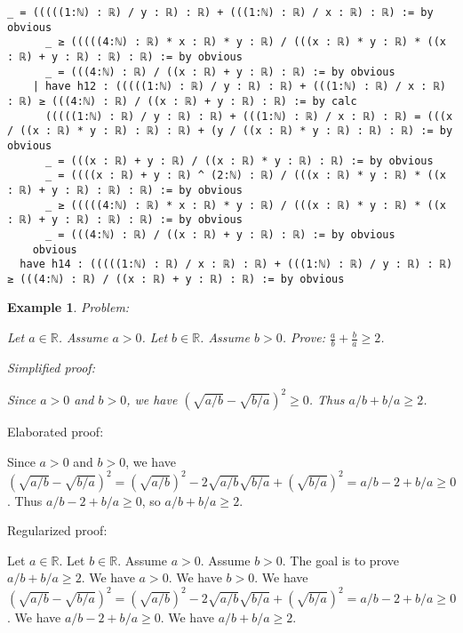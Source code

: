 \documentclass{article}
\newtheorem{example}{Example}
\begin{document}
\begin{tcolorbox}[colback=white!10, width=\linewidth]
\begin{lstlisting}[language=Lean4]
      _ = (((((1:ℕ) : ℝ) / y : ℝ) : ℝ) + (((1:ℕ) : ℝ) / x : ℝ) : ℝ) := by obvious
      _ ≥ (((((4:ℕ) : ℝ) * x : ℝ) * y : ℝ) / (((x : ℝ) * y : ℝ) * ((x : ℝ) + y : ℝ) : ℝ) : ℝ) := by obvious
      _ = (((4:ℕ) : ℝ) / ((x : ℝ) + y : ℝ) : ℝ) := by obvious
    | have h12 : (((((1:ℕ) : ℝ) / y : ℝ) : ℝ) + (((1:ℕ) : ℝ) / x : ℝ) : ℝ) ≥ (((4:ℕ) : ℝ) / ((x : ℝ) + y : ℝ) : ℝ) := by calc
      (((((1:ℕ) : ℝ) / y : ℝ) : ℝ) + (((1:ℕ) : ℝ) / x : ℝ) : ℝ) = (((x / ((x : ℝ) * y : ℝ) : ℝ) : ℝ) + (y / ((x : ℝ) * y : ℝ) : ℝ) : ℝ) := by obvious
      _ = (((x : ℝ) + y : ℝ) / ((x : ℝ) * y : ℝ) : ℝ) := by obvious
      _ = ((((x : ℝ) + y : ℝ) ^ (2:ℕ) : ℝ) / (((x : ℝ) * y : ℝ) * ((x : ℝ) + y : ℝ) : ℝ) : ℝ) := by obvious
      _ ≥ (((((4:ℕ) : ℝ) * x : ℝ) * y : ℝ) / (((x : ℝ) * y : ℝ) * ((x : ℝ) + y : ℝ) : ℝ) : ℝ) := by obvious
      _ = (((4:ℕ) : ℝ) / ((x : ℝ) + y : ℝ) : ℝ) := by obvious
    obvious
  have h14 : (((((1:ℕ) : ℝ) / x : ℝ) : ℝ) + (((1:ℕ) : ℝ) / y : ℝ) : ℝ) ≥ (((4:ℕ) : ℝ) / ((x : ℝ) + y : ℝ) : ℝ) := by obvious

\end{lstlisting}
\end{tcolorbox}


\begin{example}
Problem:
\begin{tcolorbox}[colback=yellow!10, width=\linewidth]
Let $a\in\mathbb{R}$. Assume $a > 0$.
    Let $b\in\mathbb{R}$. Assume $b > 0$.
    Prove: $\frac{a}{b} + \frac{b}{a} \ge 2$.
\end{tcolorbox}

Simplified proof:
\begin{tcolorbox}[colback=blue!10, width=\linewidth]
Since $a>0$ and $b>0$, we have $(\sqrt{a/b} - \sqrt{b/a})^2 \ge 0$. Thus $a/b + b/a \ge 2$.
\end{tcolorbox}
\end{example}

Elaborated proof:
\begin{tcolorbox}[colback=green!10, width=\linewidth]
Since $a>0$ and $b>0$, we have $(\sqrt{a/b} - \sqrt{b/a})^2 = (\sqrt{a/b})^2 - 2\sqrt{a/b}\sqrt{b/a} + (\sqrt{b/a})^2 = a/b - 2 + b/a \ge 0$. Thus $a/b - 2 + b/a \ge 0$, so $a/b + b/a \ge 2$.
\end{tcolorbox}

Regularized proof:
\begin{tcolorbox}[colback=red!10, width=\linewidth]
Let $a\in\mathbb{R}$.
Let $b\in\mathbb{R}$.
Assume $a>0$.
Assume $b>0$.
The goal is to prove $a/b + b/a \ge 2$.
We have $a>0$.
We have $b>0$.
We have ${{(\sqrt{a/b} - \sqrt{b/a})}}^2 = {{(\sqrt{a/b})}}^2 - 2\sqrt{a/b}\sqrt{b/a} + {{(\sqrt{b/a})}}^2 = a/b - 2 + b/a \ge 0$.
We have $a/b - 2 + b/a \ge 0$.
We have $a/b + b/a \ge 2$.
\end{tcolorbox}
\end{document}
